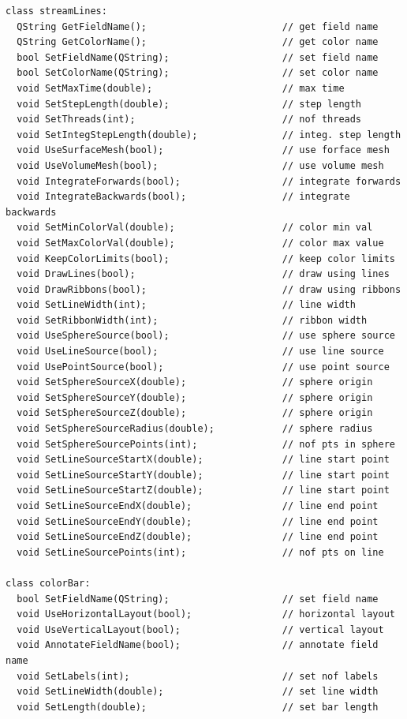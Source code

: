 \documentclass[a4paper,12pt]{article}
\begin{document}
\begin{footnotesize}
\begin{verbatim}
class streamLines:
  QString GetFieldName();                        // get field name
  QString GetColorName();                        // get color name
  bool SetFieldName(QString);                    // set field name
  bool SetColorName(QString);                    // set color name
  void SetMaxTime(double);                       // max time
  void SetStepLength(double);                    // step length
  void SetThreads(int);                          // nof threads
  void SetIntegStepLength(double);               // integ. step length
  void UseSurfaceMesh(bool);                     // use forface mesh
  void UseVolumeMesh(bool);                      // use volume mesh
  void IntegrateForwards(bool);                  // integrate forwards
  void IntegrateBackwards(bool);                 // integrate backwards
  void SetMinColorVal(double);                   // color min val
  void SetMaxColorVal(double);                   // color max value
  void KeepColorLimits(bool);                    // keep color limits
  void DrawLines(bool);                          // draw using lines
  void DrawRibbons(bool);                        // draw using ribbons
  void SetLineWidth(int);                        // line width
  void SetRibbonWidth(int);                      // ribbon width
  void UseSphereSource(bool);                    // use sphere source
  void UseLineSource(bool);                      // use line source
  void UsePointSource(bool);                     // use point source
  void SetSphereSourceX(double);                 // sphere origin
  void SetSphereSourceY(double);                 // sphere origin
  void SetSphereSourceZ(double);                 // sphere origin
  void SetSphereSourceRadius(double);            // sphere radius
  void SetSphereSourcePoints(int);               // nof pts in sphere
  void SetLineSourceStartX(double);              // line start point
  void SetLineSourceStartY(double);              // line start point
  void SetLineSourceStartZ(double);              // line start point
  void SetLineSourceEndX(double);                // line end point
  void SetLineSourceEndY(double);                // line end point
  void SetLineSourceEndZ(double);                // line end point
  void SetLineSourcePoints(int);                 // nof pts on line

class colorBar:
  bool SetFieldName(QString);                    // set field name
  void UseHorizontalLayout(bool);                // horizontal layout
  void UseVerticalLayout(bool);                  // vertical layout
  void AnnotateFieldName(bool);                  // annotate field name
  void SetLabels(int);                           // set nof labels
  void SetLineWidth(double);                     // set line width
  void SetLength(double);                        // set bar length


\end{verbatim}
\end{footnotesize}
\end{document}
